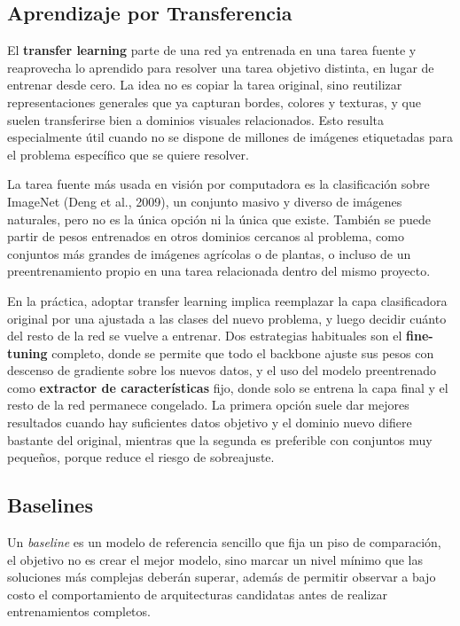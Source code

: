 \documentclass[12pt,letterpaper]{article}
\begin{document}
\subsection{Aprendizaje por Transferencia}

El \textbf{transfer learning} parte de una red ya entrenada en una tarea fuente y reaprovecha lo aprendido para resolver una tarea objetivo distinta, en lugar de entrenar desde cero. La idea no es copiar la tarea original, sino reutilizar representaciones generales que ya capturan bordes, colores y texturas, y que suelen transferirse bien a dominios visuales relacionados. Esto resulta especialmente \'util cuando no se dispone de millones de im\'agenes etiquetadas para el problema espec\'ifico que se quiere resolver.

La tarea fuente m\'as usada en visi\'on por computadora es la clasificaci\'on sobre ImageNet (Deng et al., 2009), un conjunto masivo y diverso de im\'agenes naturales, pero no es la \'unica opci\'on ni la \'unica que existe. Tambi\'en se puede partir de pesos entrenados en otros dominios cercanos al problema, como conjuntos m\'as grandes de im\'agenes agr\'icolas o de plantas, o incluso de un preentrenamiento propio en una tarea relacionada dentro del mismo proyecto.

En la pr\'actica, adoptar transfer learning implica reemplazar la capa clasificadora original por una ajustada a las clases del nuevo problema, y luego decidir cu\'anto del resto de la red se vuelve a entrenar. Dos estrategias habituales son el \textbf{fine-tuning} completo, donde se permite que todo el backbone ajuste sus pesos con descenso de gradiente sobre los nuevos datos, y el uso del modelo preentrenado como \textbf{extractor de caracter\'isticas} fijo, donde solo se entrena la capa final y el resto de la red permanece congelado. La primera opci\'on suele dar mejores resultados cuando hay suficientes datos objetivo y el dominio nuevo difiere bastante del original, mientras que la segunda es preferible con conjuntos muy peque\~nos, porque reduce el riesgo de sobreajuste.

\subsection{Baselines}

Un \textit{baseline} es un modelo de referencia sencillo que fija un piso de comparaci\'on, el objetivo no es crear el mejor modelo, sino marcar un nivel m\'inimo que las soluciones m\'as complejas deber\'an superar, además de permitir observar a bajo costo el comportamiento de arquitecturas candidatas antes de realizar entrenamientos completos.
\end{document}
